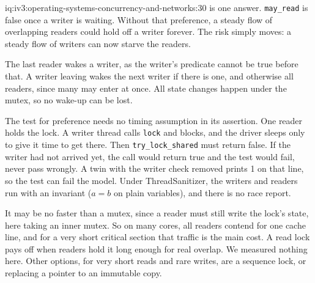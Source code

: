\begin{solution}{iq:iv3:operating-systems-concurrency-and-networks:30}
 is one answer. \texttt{may\_read} is false once a writer is waiting. Without that preference, a steady flow of overlapping readers could hold off a writer forever. The risk simply moves: a steady flow of writers can now starve the readers.
\label{lst:iv3:os:rwlock}

The last reader wakes a writer, as the writer's predicate cannot be true before that. A writer leaving wakes the next writer if there is one, and otherwise all readers, since many may enter at once. All state changes happen under the mutex, so no wake-up can be lost.

The test for preference needs no timing assumption in its assertion. One reader holds the lock. A writer thread calls \texttt{lock} and blocks, and the driver sleeps only to give it time to get there. Then \texttt{try\_lock\_shared} must return false. If the writer had not arrived yet, the call would return true and the test would fail, never pass wrongly. A twin with the writer check removed prints 1 on that line, so the test can fail the model. Under ThreadSanitizer, the writers and readers run with an invariant ($a = b$ on plain variables), and there is no race report.

It may be no faster than a mutex, since a reader must still write the lock's state, here taking an inner mutex. So on many cores, all readers contend for one cache line, and for a very short critical section that traffic is the main cost. A read lock pays off when readers hold it long enough for real overlap. We measured nothing here. Other options, for very short reads and rare writes, are a sequence lock, or replacing a pointer to an immutable copy.

\end{solution}

